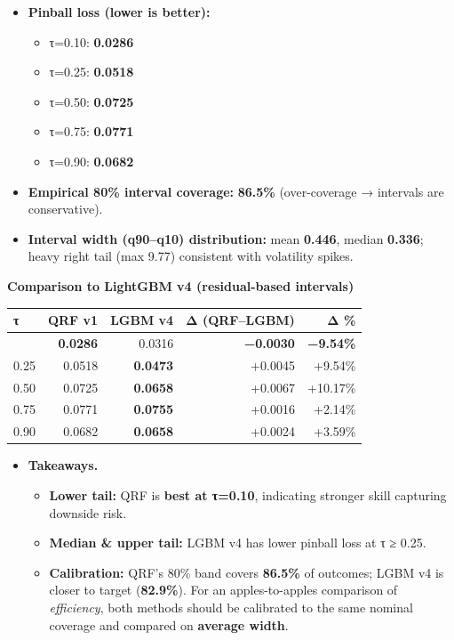 \documentclass[
  a4paper,
  DIV=11,
  numbers=noendperiod]{scrreprt}
\providecommand{\tightlist}{%
  \setlength{\itemsep}{0pt}\setlength{\parskip}{0pt}}
\begin{document}
\begin{itemize}
\item
  \textbf{Pinball loss (lower is better):}

  \begin{itemize}
  \tightlist
  \item
    τ=0.10: \textbf{0.0286}
  \item
    τ=0.25: \textbf{0.0518}
  \item
    τ=0.50: \textbf{0.0725}
  \item
    τ=0.75: \textbf{0.0771}
  \item
    τ=0.90: \textbf{0.0682}
  \end{itemize}
\item
  \textbf{Empirical 80\% interval coverage:} \textbf{86.5\%}
  (over-coverage → intervals are conservative).
\item
  \textbf{Interval width (q90--q10) distribution:} mean \textbf{0.446},
  median \textbf{0.336}; heavy right tail (max 9.77) consistent with
  volatility spikes.
\end{itemize}

\textbf{Comparison to LightGBM v4 (residual-based intervals)}

\begin{longtable}[]{@{}lrrrr@{}}
\toprule\noalign{}
τ & QRF v1 & LGBM v4 & Δ (QRF--LGBM) & Δ \% \\
\midrule\noalign{}
\endhead
\bottomrule\noalign{}
\endlastfoot
0.10 & \textbf{0.0286} & 0.0316 & \textbf{−0.0030} & \textbf{−9.54\%} \\
0.25 & 0.0518 & \textbf{0.0473} & +0.0045 & +9.54\% \\
0.50 & 0.0725 & \textbf{0.0658} & +0.0067 & +10.17\% \\
0.75 & 0.0771 & \textbf{0.0755} & +0.0016 & +2.14\% \\
0.90 & 0.0682 & \textbf{0.0658} & +0.0024 & +3.59\% \\
\end{longtable}

\begin{itemize}
\item
  \textbf{Takeaways.}

  \begin{itemize}
  \tightlist
  \item
    \textbf{Lower tail:} QRF is \textbf{best at τ=0.10}, indicating
    stronger skill capturing downside risk.
  \item
    \textbf{Median \& upper tail:} LGBM v4 has lower pinball loss at τ ≥
    0.25.
  \item
    \textbf{Calibration:} QRF's 80\% band covers \textbf{86.5\%} of
    outcomes; LGBM v4 is closer to target (\textbf{82.9\%}). For an
    apples-to-apples comparison of \emph{efficiency}, both methods
    should be calibrated to the same nominal coverage and compared on
    \textbf{average width}.
  \end{itemize}
\end{itemize}
\end{document}
